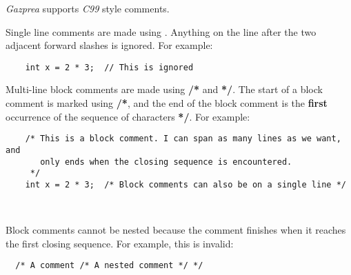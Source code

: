 \documentclass[../gazprea.tex]{subfiles}
\begin{document}
\textit{Gazprea} supports \textit{C99} style comments.

Single line comments are made using \code{//}. Anything on the line after the two adjacent forward
slashes is ignored. For example:
\begin{lstlisting}
	int x = 2 * 3;  // This is ignored
\end{lstlisting}

Multi-line block comments are made using \textbf{/*} and \textbf{*/}. The start of a block comment
is marked using \textbf{/*}, and the end of the block comment is the \textbf{first} occurrence of
the sequence of characters \textbf{*/}. For example:
\begin{lstlisting}
	/* This is a block comment. I can span as many lines as we want, and
	   only ends when the closing sequence is encountered.
	 */
	int x = 2 * 3;  /* Block comments can also be on a single line */
\end{lstlisting}

\\

Block comments cannot be nested because the comment finishes when it reaches the first closing
sequence. For example, this is invalid:
\begin{lstlisting}
  /* A comment /* A nested comment */ */
\end{lstlisting}
\end{document}
